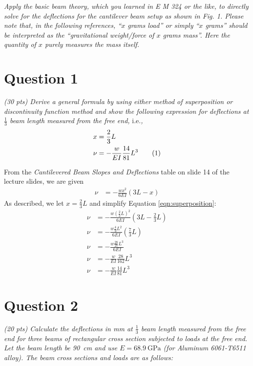 \documentclass[12 pt]{article}
\newcommand\numberthis{\addtocounter{equation}{1}\tag{\theequation}}
\begin{document}
\textit{Apply the basic beam theory, which you learned in E M 324 or the like, to directly solve for the deflections for the cantilever beam setup as shown in Fig. 1. Please note that, in the following references, ``$x$ grams load'' or simply ``$x$ grams'' should be interpreted as the ``gravitational weight/force of $x$ grams mass''. Here the quantity of $x$ purely measures the mass itself.}

\section*{Question 1} \label{sec:question_1}
\textit{(30 pts) Derive a general formula by using either method of superposition or discontinuity function method and show the following expression for deflections at $\frac{1}{3}$ beam length measured from the free end, }i.e.\textit{,}
\begin{align*}
	x&=\frac{2}{3}L\\
	\nu&=-\frac{w}{EI}\frac{14}{81}L^3 \numberthis\label{eqn:deflection}
\end{align*}

From the \textit{Cantilevered Beam Slopes and Deflections} table on slide \num{14} of the lecture slides, we are given
\begin{align} \label{eqn:superposition}
	\nu&=-\frac{wx^2}{6EI}(3L-x)
\end{align}
As described, we let $x=\frac{2}{3}L$ and simplify Equation \ref{eqn:superposition}:
\begin{align*}
	\nu&=-\frac{w(\frac{2}{3}L)^2}{6EI}\left(3L-\frac{2}{3}L\right)\\
	\nu&=-\frac{w\frac{4}{9}L^2}{6EI}\left(\frac{7}{3}L\right)\\
	\nu&=-\frac{w\frac{28}{27}L^3}{6EI}\\
	\nu&=-\frac{w}{EI}\frac{28}{162}L^3\\
	\nu&=-\frac{w}{EI}\frac{14}{81}L^3
\end{align*}

\section*{Question 2} \label{sec:question_2}
\textit{(20 pts) Calculate the deflections in \unit{\milli\meter} at $\frac{1}{3}$ beam length measured from the free end for three beams of rectangular cross section subjected to loads at the free end. Let the beam length be \qty{90}{\centi\meter} and use $E=\qty{68.9}{\GPa}$ (for Aluminum 6061-T6511 alloy). The beam cross sections and loads are as follows:}
\end{document}
